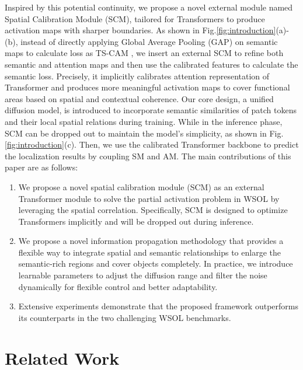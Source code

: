 \documentclass[runningheads]{llncs}
\begin{document}
Inspired by this potential continuity, we propose a novel external module named Spatial Calibration Module (SCM), tailored for Transformers to produce activation maps with sharper boundaries.
As shown in Fig.\ref{fig:introduction}(a)-(b), instead of directly applying  Global Average Pooling (GAP) on semantic maps to calculate loss as TS-CAM \cite{gao2021tscam}, we insert an external SCM to refine both semantic and attention maps and then use the calibrated features to calculate the semantic loss. 
Precisely, it implicitly calibrates attention representation of Transformer and produces more meaningful activation maps to cover functional areas based on spatial and contextual coherence. 
Our core design, a unified diffusion model, is introduced to incorporate semantic similarities of patch tokens and their local spatial relations during training.
While in the inference phase, SCM can be dropped out to maintain the model's simplicity, as shown in Fig.\ref{fig:introduction}(c). Then, we use the calibrated Transformer backbone to predict the localization results by coupling SM and AM. 
The main contributions of this paper are as follows: 
\begin{enumerate}
\item We propose a novel spatial calibration module (SCM) as an external Transformer module to solve the partial activation problem in WSOL by leveraging the spatial correlation. Specifically, SCM is designed to optimize Transformers implicitly and will be dropped out during inference.
\item We propose a novel information propagation methodology that provides a flexible way to integrate spatial and semantic relationships to enlarge the semantic-rich regions and cover objects completely. In practice, we introduce learnable parameters to adjust the diffusion range and filter the noise dynamically for flexible control and better adaptability. 
\item Extensive experiments demonstrate that the proposed framework outperforms its counterparts in the two challenging WSOL benchmarks. 

\end{enumerate}

\section{Related Work}
\label{sec:related}
\end{document}
